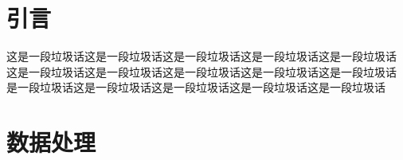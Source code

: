 \documentclass[UTF8, fontset=none]{ctexart}
\begin{document}
\clearpage
\makecover

\pagebreak

\tableofcontents

\pagebreak

\section{引言}

这是一段垃圾话这是一段垃圾话这是一段垃圾话这是一段垃圾话这是一段垃圾话
这是一段垃圾话这是一段垃圾话这是一段垃圾话这是一段垃圾话这是一段垃圾话
是一段垃圾话这是一段垃圾话这是一段垃圾话这是一段垃圾话这是一段垃圾话

\pagebreak

\section{数据处理}
\end{document}
